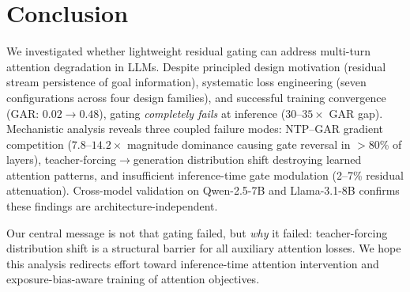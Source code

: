 \documentclass[11pt,a4paper]{article}
\newcommand{\gar}{\textsc{GAR}}
\begin{document}
\section{Conclusion}
\label{sec:conclusion}

We investigated whether lightweight residual gating can address multi-turn attention degradation in LLMs.
Despite principled design motivation (residual stream persistence of goal information), systematic loss engineering (seven configurations across four design families), and successful training convergence (\gar{}: $0.02 \to 0.48$), gating \emph{completely fails} at inference ($30$--$35\times$ \gar{} gap).
Mechanistic analysis reveals three coupled failure modes: NTP--\gar{} gradient competition ($7.8$--$14.2\times$ magnitude dominance causing gate reversal in $>$80\% of layers), teacher-forcing$\to$generation distribution shift destroying learned attention patterns, and insufficient inference-time gate modulation (2--7\% residual attenuation).
Cross-model validation on Qwen-2.5-7B and Llama-3.1-8B confirms these findings are architecture-independent.

Our central message is not that gating failed, but \emph{why} it failed: teacher-forcing distribution shift is a structural barrier for all auxiliary attention losses.
We hope this analysis redirects effort toward inference-time attention intervention and exposure-bias-aware training of attention objectives.
\end{document}
